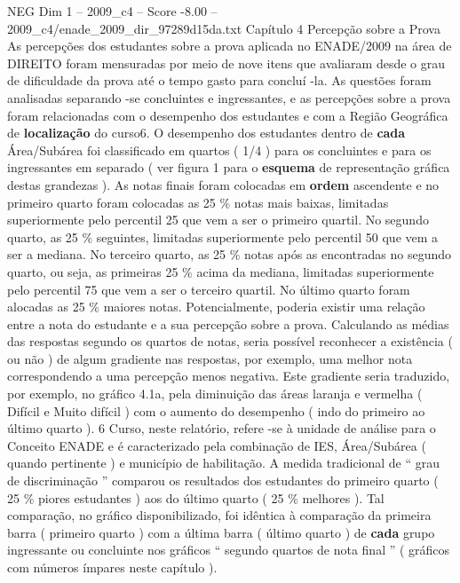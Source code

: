 \begin{textsample}{NEG Dim 1 – 2009\_c4 – Score -8.00 – 2009\_c4/enade\_2009\_dir\_97289d15da.txt}  \label{ex:f1_neg_024}
Capítulo 4 Percepção sobre a Prova As percepções dos estudantes sobre a prova aplicada no ENADE/2009 na área de DIREITO foram mensuradas por meio de nove itens que avaliaram desde o grau de dificuldade da prova até o tempo gasto para concluí -la.
As questões foram analisadas separando -se concluintes e ingressantes, e as percepções sobre a prova foram relacionadas com o desempenho dos estudantes e com a Região Geográfica de \textbf{localização} do curso6.
O desempenho dos estudantes dentro de \textbf{cada} Área/Subárea foi classificado em quartos ( 1/4 ) para os concluintes e para os ingressantes em separado ( ver figura 1 para o \textbf{esquema} de representação gráfica destas grandezas ).
As notas finais foram colocadas em \textbf{ordem} ascendente e no primeiro quarto foram colocadas as 25 \% notas mais baixas, limitadas superiormente pelo percentil 25 que vem a ser o primeiro quartil.
No segundo quarto, as 25 \% seguintes, limitadas superiormente pelo percentil 50 que vem a ser a mediana.
No terceiro quarto, as 25 \% notas após as encontradas no segundo quarto, ou seja, as primeiras 25 \% acima da mediana, limitadas superiormente pelo percentil 75 que vem a ser o terceiro quartil.
No último quarto foram alocadas as 25 \% maiores notas.
Potencialmente, poderia existir uma relação entre a nota do estudante e a sua percepção sobre a prova.
Calculando as médias das respostas segundo os quartos de notas, seria possível reconhecer a existência ( ou não ) de algum gradiente nas respostas, por exemplo, uma melhor nota correspondendo a uma percepção menos negativa.
Este gradiente seria traduzido, por exemplo, no gráfico 4.1a, pela diminuição das áreas laranja e vermelha ( Difícil e Muito difícil ) com o aumento do desempenho ( indo do primeiro ao último quarto ). 6 Curso, neste relatório, refere -se à unidade de análise para o Conceito ENADE e é caracterizado pela combinação de IES, Área/Subárea ( quando pertinente ) e município de habilitação.
A medida tradicional de “ grau de discriminação ” comparou os resultados dos estudantes do primeiro quarto ( 25 \% piores estudantes ) aos do último quarto ( 25 \% melhores ).
Tal comparação, no gráfico disponibilizado, foi idêntica à comparação da primeira barra ( primeiro quarto ) com a última barra ( último quarto ) de \textbf{cada} grupo ingressante ou concluinte nos gráficos “ segundo quartos de nota final ” ( gráficos com números ímpares neste capítulo ).

\end{textsample}
